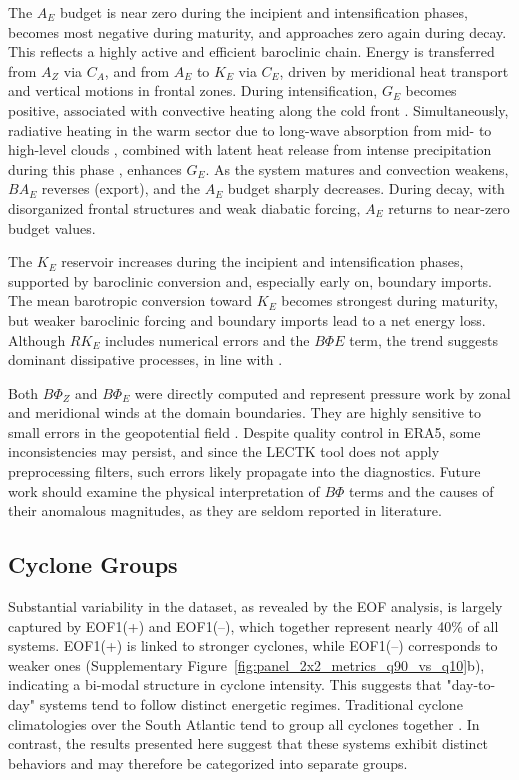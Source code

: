 \documentclass[pdflatex,sn-chicago]{sn-jnl}%
\theoremstyle{plain}
\theoremstyle{definition}
\theoremstyle{remark}
\theoremstyle{definition}
\begin{document}
The $A_E$ budget is near zero during the incipient and intensification phases, becomes most negative during maturity, and approaches zero again during decay. This reflects a highly active and efficient baroclinic chain. Energy is transferred from $A_Z$ via $C_A$, and from $A_E$ to $K_E$ via $C_E$, driven by meridional heat transport and vertical motions in frontal zones. During intensification, $G_E$ becomes positive, associated with convective heating along the cold front \citep[e.g.,][]{govekar2011three}. Simultaneously, radiative heating in the warm sector due to long-wave absorption from mid- to high-level clouds \citep{lau1997comparing,keshtgar2023cloud}, combined with latent heat release from intense precipitation during this phase \citep{mcerlich2023assessment}, enhances $G_E$. As the system matures and convection weakens, $BA_E$ reverses (export), and the $A_E$ budget sharply decreases. During decay, with disorganized frontal structures and weak diabatic forcing, $A_E$ returns to near-zero budget values.

The $K_E$ reservoir increases during the incipient and intensification phases, supported by baroclinic conversion and, especially early on, boundary imports. The mean barotropic conversion toward $K_E$ becomes strongest during maturity, but weaker baroclinic forcing and boundary imports lead to a net energy loss. Although $RK_E$ includes numerical errors and the $B\Phi E$ term, the trend suggests dominant dissipative processes, in line with \citet{smith1980energetics}.

Both $B\Phi_Z$ and $B\Phi_E$ were directly computed and represent pressure work by zonal and meridional winds at the domain boundaries. They are highly sensitive to small errors in the geopotential field \citep{brennan1980zonal}. Despite quality control in ERA5, some inconsistencies may persist, and since the LECTK tool does not apply preprocessing filters, such errors likely propagate into the diagnostics. Future work should examine the physical interpretation of $B\Phi$ terms and the causes of their anomalous magnitudes, as they are seldom reported in literature.


\subsection{Cyclone Groups}

Substantial variability in the dataset, as revealed by the EOF analysis, is largely captured by EOF1(+) and EOF1(–), which together represent nearly 40\% of all systems. EOF1(+) is linked to stronger cyclones, while EOF1(–) corresponds to weaker ones (Supplementary Figure~\ref{fig:panel_2x2_metrics_q90_vs_q10}b), indicating a bi-modal structure in cyclone intensity. This suggests that "day-to-day" systems tend to follow distinct energetic regimes. Traditional cyclone climatologies over the South Atlantic tend to group all cyclones together \citep[e.g.,]{sinclair1994objective,hoskins2005new,reboita2010south,gramcianinov2019properties}. In contrast, the results presented here suggest that these systems exhibit distinct behaviors and may therefore be categorized into separate groups.
\end{document}
